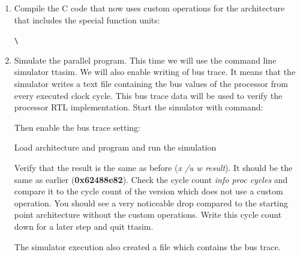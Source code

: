 \documentclass[a4paper,twoside]{tceusermanual}
\begin{document}
\begin{enumerate}
\begin{verbatim}
 input = message[byte];
 _OA_REFLECT8(input, output);
 data = (unsigned char) output ^ (remainder >> (WIDTH - 8));
 remainder = crcTable[data] ^ (remainder << 8);
\end{verbatim}

Next we will modify the return statement. Originally it uses a
REFLECT\_REMAINDER macro where nBits is defined as WIDTH and data is
remainder. Simply use \_OA\_REFLECT32 macro before return statement and
replace the original macro with the variable output:

\begin{verbatim}
 _OA_REFLECT32(remainder, output);
 return (output ^ FINAL_XOR_VALUE);
\end{verbatim}

And now we are ready. Remember to save the file.

\item%
Compile the C code that now uses custom operations for the architecture that includes
the special function units:

\verb#\#\\

\item%
Simulate the parallel program. This time we will use the command line simulator
ttasim. We will also enable writing of bus trace. It means that the simulator
writes a text file containing the bus values of the processor from every
executed clock cycle. This bus trace data will be used to verify the processor
RTL implementation. Start the simulator with command:


Then enable the bus trace setting:


Load architecture and program and run the simulation




Verify that the result is the same as before (\textit{x /u w result}). It
should be the same as earlier (\textbf{0x62488e82}).
Check the cycle count \textit{info proc cycles}  %
and compare it to the cycle 
count of the version which does not use a custom operation. You should see 
a very noticeable drop compared to the starting point architecture without
the custom operations. Write this cycle count down for a later step and quit ttasim.

The simulator execution also created a file
 which contains the bus
trace.

\end{enumerate}
\end{document}
